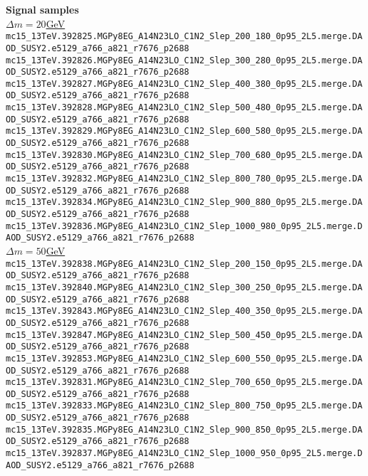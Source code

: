 \textbf{Signal samples}\\
\tiny
\underline{$\Delta m=20$GeV} \\
\texttt{mc15\_13TeV.392825.MGPy8EG\_A14N23LO\_C1N2\_Slep\_200\_180\_0p95\_2L5.merge.DAOD\_SUSY2.e5129\_a766\_a821\_r7676\_p2688} \\
\texttt{mc15\_13TeV.392826.MGPy8EG\_A14N23LO\_C1N2\_Slep\_300\_280\_0p95\_2L5.merge.DAOD\_SUSY2.e5129\_a766\_a821\_r7676\_p2688} \\
\texttt{mc15\_13TeV.392827.MGPy8EG\_A14N23LO\_C1N2\_Slep\_400\_380\_0p95\_2L5.merge.DAOD\_SUSY2.e5129\_a766\_a821\_r7676\_p2688} \\
\texttt{mc15\_13TeV.392828.MGPy8EG\_A14N23LO\_C1N2\_Slep\_500\_480\_0p95\_2L5.merge.DAOD\_SUSY2.e5129\_a766\_a821\_r7676\_p2688} \\
\texttt{mc15\_13TeV.392829.MGPy8EG\_A14N23LO\_C1N2\_Slep\_600\_580\_0p95\_2L5.merge.DAOD\_SUSY2.e5129\_a766\_a821\_r7676\_p2688} \\
\texttt{mc15\_13TeV.392830.MGPy8EG\_A14N23LO\_C1N2\_Slep\_700\_680\_0p95\_2L5.merge.DAOD\_SUSY2.e5129\_a766\_a821\_r7676\_p2688} \\
\texttt{mc15\_13TeV.392832.MGPy8EG\_A14N23LO\_C1N2\_Slep\_800\_780\_0p95\_2L5.merge.DAOD\_SUSY2.e5129\_a766\_a821\_r7676\_p2688} \\
\texttt{mc15\_13TeV.392834.MGPy8EG\_A14N23LO\_C1N2\_Slep\_900\_880\_0p95\_2L5.merge.DAOD\_SUSY2.e5129\_a766\_a821\_r7676\_p2688} \\
\texttt{mc15\_13TeV.392836.MGPy8EG\_A14N23LO\_C1N2\_Slep\_1000\_980\_0p95\_2L5.merge.DAOD\_SUSY2.e5129\_a766\_a821\_r7676\_p2688} \\

\underline{$\Delta m=50$GeV}\\
\texttt{mc15\_13TeV.392838.MGPy8EG\_A14N23LO\_C1N2\_Slep\_200\_150\_0p95\_2L5.merge.DAOD\_SUSY2.e5129\_a766\_a821\_r7676\_p2688} \\
\texttt{mc15\_13TeV.392840.MGPy8EG\_A14N23LO\_C1N2\_Slep\_300\_250\_0p95\_2L5.merge.DAOD\_SUSY2.e5129\_a766\_a821\_r7676\_p2688} \\
\texttt{mc15\_13TeV.392843.MGPy8EG\_A14N23LO\_C1N2\_Slep\_400\_350\_0p95\_2L5.merge.DAOD\_SUSY2.e5129\_a766\_a821\_r7676\_p2688} \\
\texttt{mc15\_13TeV.392847.MGPy8EG\_A14N23LO\_C1N2\_Slep\_500\_450\_0p95\_2L5.merge.DAOD\_SUSY2.e5129\_a766\_a821\_r7676\_p2688} \\
\texttt{mc15\_13TeV.392853.MGPy8EG\_A14N23LO\_C1N2\_Slep\_600\_550\_0p95\_2L5.merge.DAOD\_SUSY2.e5129\_a766\_a821\_r7676\_p2688} \\
\texttt{mc15\_13TeV.392831.MGPy8EG\_A14N23LO\_C1N2\_Slep\_700\_650\_0p95\_2L5.merge.DAOD\_SUSY2.e5129\_a766\_a821\_r7676\_p2688} \\
\texttt{mc15\_13TeV.392833.MGPy8EG\_A14N23LO\_C1N2\_Slep\_800\_750\_0p95\_2L5.merge.DAOD\_SUSY2.e5129\_a766\_a821\_r7676\_p2688} \\
\texttt{mc15\_13TeV.392835.MGPy8EG\_A14N23LO\_C1N2\_Slep\_900\_850\_0p95\_2L5.merge.DAOD\_SUSY2.e5129\_a766\_a821\_r7676\_p2688} \\
\texttt{mc15\_13TeV.392837.MGPy8EG\_A14N23LO\_C1N2\_Slep\_1000\_950\_0p95\_2L5.merge.DAOD\_SUSY2.e5129\_a766\_a821\_r7676\_p2688} \\

